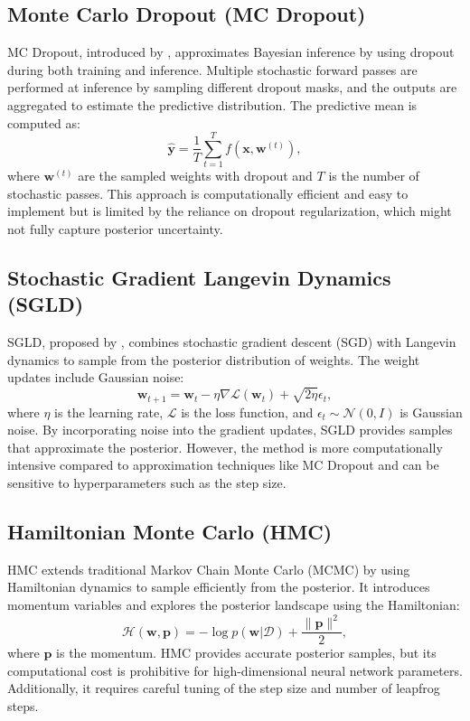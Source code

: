 \documentclass{article}
\begin{document}
\subsection{Monte Carlo Dropout (MC Dropout)}
MC Dropout, introduced by \cite{gal16}, approximates Bayesian inference by using dropout during both training and inference. Multiple stochastic forward passes are performed at inference by sampling different dropout masks, and the outputs are aggregated to estimate the predictive distribution. The predictive mean is computed as:
$$
\hat{\mathbf{y}} = \frac{1}{T} \sum_{t=1}^{T} f(\mathbf{x}, \mathbf{w}^{(t)}),
$$
where  $\mathbf{w}^{(t)}$  are the sampled weights with dropout and  $T$  is the number of stochastic passes. This approach is computationally efficient and easy to implement but is limited by the reliance on dropout regularization, which might not fully capture posterior uncertainty.

\subsection{Stochastic Gradient Langevin Dynamics (SGLD)}
SGLD, proposed by \cite{well11}, combines stochastic gradient descent (SGD) with Langevin dynamics to sample from the posterior distribution of weights. The weight updates include Gaussian noise:
$$
\mathbf{w}_{t+1} = \mathbf{w}_t - \eta \nabla \mathcal{L}(\mathbf{w}_t) + \sqrt{2\eta} \epsilon_t,
$$
where  $\eta$  is the learning rate,  $\mathcal{L}$  is the loss function, and  $\epsilon_t \sim \mathcal{N}(0, I)$  is Gaussian noise. By incorporating noise into the gradient updates, SGLD provides samples that approximate the posterior. However, the method is more computationally intensive compared to approximation techniques like MC Dropout and can be sensitive to hyperparameters such as the step size.

\subsection{Hamiltonian Monte Carlo (HMC)}
HMC \cite{neal12} extends traditional Markov Chain Monte Carlo (MCMC) by using Hamiltonian dynamics to sample efficiently from the posterior. It introduces momentum variables and explores the posterior landscape using the Hamiltonian:
$$
\mathcal{H}(\mathbf{w}, \mathbf{p}) = -\log p(\mathbf{w} | \mathcal{D}) + \frac{\|\mathbf{p}\|^2}{2},
$$
where  $\mathbf{p}$  is the momentum. HMC provides accurate posterior samples, but its computational cost is prohibitive for high-dimensional neural network parameters. Additionally, it requires careful tuning of the step size and number of leapfrog steps.
\end{document}
